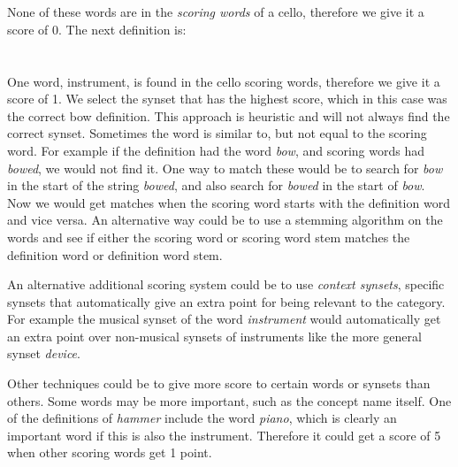 \noindent{}
\\\\None of these words are in the \emph{scoring words} of a cello, therefore we give it a score of 0. The next definition is:\\

\noindent{}
\\\\One word, instrument, is found in the cello scoring words, therefore we give it a score of 1. We select the synset that has the highest score, which in this case was the correct bow definition. This approach is heuristic and will not always find the correct synset.
Sometimes the word is similar to, but not equal to the scoring word. For example if the definition had the word \emph{bow}, and scoring words had \emph{bowed}, we would not find it. One way to match these would be to search for \emph{bow} in the start of the string \emph{bowed}, and also search for \emph{bowed} in the start of \emph{bow}. Now we would get matches when the scoring word starts with the definition word and vice versa. An alternative way could be to use a stemming algorithm on the words and see if either the scoring word or scoring word stem matches the definition word or definition word stem.

An alternative additional scoring system could be to use \emph{context synsets}, specific synsets that automatically give an extra point for being relevant to the category. For example the musical synset of the word \emph{instrument} would automatically get an extra point over non-musical synsets of instruments like the more general synset \emph{device}.

Other techniques could be to give more score to certain words or synsets than others. Some words may be more important, such as the concept name itself. One of the definitions of \emph{hammer} include the word \emph{piano}, which is clearly an important word if this is also the instrument. Therefore it could get a score of 5 when other scoring words get 1 point.

